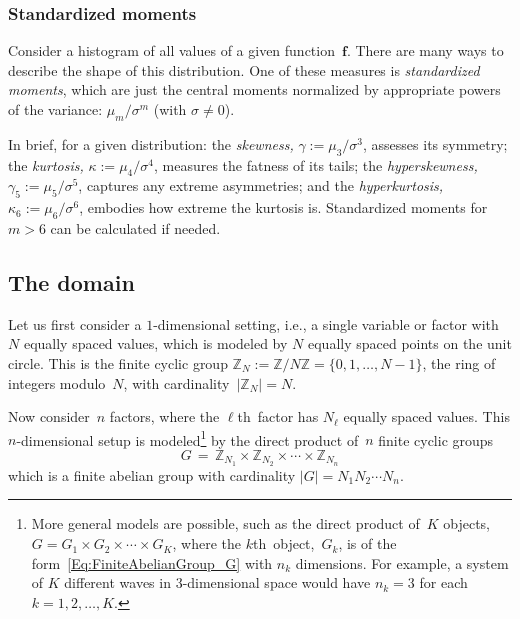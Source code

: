 \documentclass[letterpaper,11pt]{article}
\newcommand{\bs}[1]{{\boldsymbol{#1}}}
\newcommand{\abs}[1]{\vert #1 \vert}
\newcommand{\set}[1]{\{ #1 \}}
\newcommand{\Int}{\mathbb Z}
\newcommand{\kth}{$k$th}
\newcommand{\ellth}{$\ell$th}
\theoremstyle{definition} \newtheorem{remark}{Remark}
\begin{document}
\subsubsection{Standardized moments}
Consider a histogram of all values of a given function~$\bs{f}$. There are many ways to describe the shape of this distribution. One of these measures is \emph{standardized moments}, which are just the central moments normalized by appropriate powers of the variance: $\mu_m/\sigma^m$ (with $\sigma\neq0$).

In brief, for a given distribution:
the \emph{skewness,} $\gamma := \mu_3/\sigma^3$, assesses its symmetry;
the \emph{kurtosis,} $\kappa := \mu_4/\sigma^4$, measures the fatness of its tails;
the \emph{hyperskewness,} $\gamma_5 := \mu_5/\sigma^5$, captures any extreme asymmetries;
and the \emph{hyperkurtosis,} $\kappa_6 := \mu_6/\sigma^6$, embodies how extreme the kurtosis is. Standardized moments for $m>6$ can be calculated if needed.


\subsection{The domain}
Let us first consider a $1$-dimensional setting, i.e., a single variable or factor with $N$ equally spaced values, which is modeled by $N$ equally spaced points on the unit circle. This is the finite cyclic group $\Int_N := \Int/N\Int = \set{0,1,\ldots,N-1}$, the ring of integers modulo~$N$, with cardinality~$\abs{\Int_N}=N$.

Now consider~$n$ factors, where the \ellth\ factor has $N_\ell$ equally spaced values. This $n$-dimensional setup is modeled\footnote{More general models are possible, such as the direct product of~$K$ objects, $G = G_1 \times G_2 \times \cdots \times G_K$, where the \kth\ object,~$G_k$, is of the form~\eqref{Eq:FiniteAbelianGroup_G} with $n_k$ dimensions. For example, a system of $K$ different waves in $3$-dimensional space would have $n_k=3$ for each $k=1,2,\ldots,K$.} by the direct product of~$n$ finite cyclic groups
\begin{equation} \label{Eq:FiniteAbelianGroup_G}
G \,=\, \Int_{N_1} \times \Int_{N_2} \times \cdots \times \Int_{N_n}
\end{equation}
which is a finite abelian group with cardinality $\abs{G} = N_1 N_2 \cdots N_n$.
\end{document}
